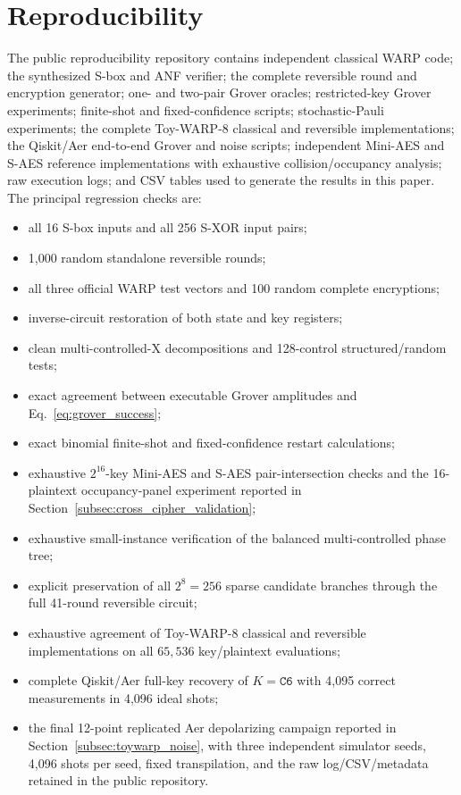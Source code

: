 \documentclass[pdflatex,sn-nature]{sn-jnl}
\theoremstyle{thmstyleone}
\theoremstyle{thmstyletwo}
\begin{document}
\section{Reproducibility}

The public reproducibility repository contains independent classical WARP code; the synthesized S-box and ANF verifier; the complete reversible round and encryption generator; one- and two-pair Grover oracles; restricted-key Grover experiments; finite-shot and fixed-confidence scripts; stochastic-Pauli experiments; the complete Toy-WARP-8 classical and reversible implementations; the Qiskit/Aer end-to-end Grover and noise scripts; independent Mini-AES and S-AES reference implementations with exhaustive collision/occupancy analysis; raw execution logs; and CSV tables used to generate the results in this paper. The principal regression checks are:
\begin{itemize}
    \item all 16 S-box inputs and all 256 S-XOR input pairs;
    \item 1,000 random standalone reversible rounds;
    \item all three official WARP test vectors and 100 random complete encryptions;
    \item inverse-circuit restoration of both state and key registers;
    \item clean multi-controlled-X decompositions and 128-control structured/random tests;
    \item exact agreement between executable Grover amplitudes and Eq.~\eqref{eq:grover_success};
    \item exact binomial finite-shot and fixed-confidence restart calculations;
    \item exhaustive $2^{16}$-key Mini-AES and S-AES pair-intersection checks and the 16-plaintext occupancy-panel experiment reported in Section~\ref{subsec:cross_cipher_validation};
    \item exhaustive small-instance verification of the balanced multi-controlled phase tree;
    \item explicit preservation of all $2^8=256$ sparse candidate branches through the full 41-round reversible circuit;
    \item exhaustive agreement of Toy-WARP-8 classical and reversible implementations on all $65{,}536$ key/plaintext evaluations;
    \item complete Qiskit/Aer full-key recovery of $K=\mathtt{C6}$ with 4,095 correct measurements in 4,096 ideal shots;
    \item the final 12-point replicated Aer depolarizing campaign reported in Section~\ref{subsec:toywarp_noise}, with three independent simulator seeds, 4,096 shots per seed, fixed transpilation, and the raw log/CSV/metadata retained in the public repository.
\end{itemize}
\end{document}

